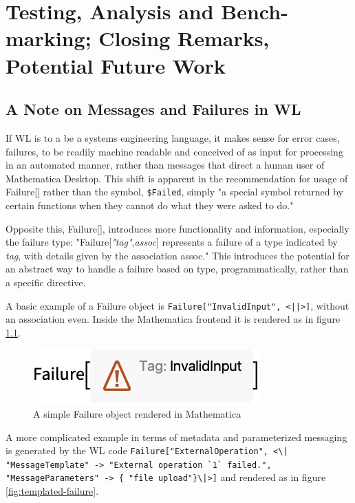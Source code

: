 \chapter{Testing, Analysis and Bench-marking; Closing Remarks, Potential Future Work}
\label{cha:Closing}

\section{A Note on Messages and Failures in WL} \label{closing:messages}

If WL is to a be a systems engineering language, it makes sense for error cases, failures, to be readily machine readable and conceived of as input for processing in an automated manner, rather than messages that direct a human user of Mathematica Desktop. This shift is apparent in the recommendation for usage of Failure[] rather than the symbol, \lstinline+$Failed+, simply "a special symbol returned by certain functions when they cannot do what they were asked to do." \cite{noauthor_failedwolfram_nodate}

Opposite this, Failure[], introduces more functionality and information, especially the failure type: "Failure[\textit{"tag"},\textit{assoc}] represents a failure of a type indicated by \textit{tag}, with details given by the association assoc." \cite{noauthor_failurewolfram_nodate} This introduces the potential for an abstract way to handle a failure based on type, programmatically, rather than a specific directive.

A basic example of a Failure object is \lstinline+Failure["InvalidInput", <||>]+, without an association even. Inside the Mathematica frontend it is rendered as in figure \ref{fig:simple-failure}.

\begin{figure}[h]
    \centering
    \includegraphics[scale=0.5]{images/closing/O_4.png}
    \caption{A simple Failure object rendered in Mathematica \cite{noauthor_failurewolfram_nodate}}
    \label{fig:simple-failure}
\end{figure}

A more complicated example in terms of metadata and parameterized messaging is generated by the WL code \lstinline$Failure["ExternalOperation", <\|
  "MessageTemplate" -> "External operation `1` failed.", 
  "MessageParameters" -> { "file upload"}\|>]$ and rendered as in figure \ref{fig:templated-failure}.

